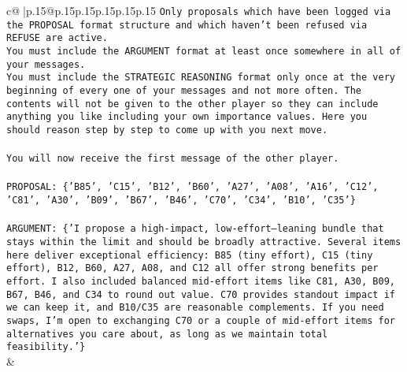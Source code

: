 \documentclass{article}
\begin{document}
{\begin{supertabular}{c@{$\;$}|p{.15\linewidth}@{}p{.15\linewidth}p{.15\linewidth}p{.15\linewidth}p{.15\linewidth}p{.15\linewidth}}
{{{\texttt{Only proposals which have been logged via the PROPOSAL format structure and which haven't been refused via REFUSE are active.} \\
\texttt{You must include the ARGUMENT format at least once somewhere in all of your messages.} \\
\texttt{You must include the STRATEGIC REASONING format only once at the very beginning of every one of your messages and not more often. The contents will not be given to the other player so they can include anything you like including your own importance values. Here you should reason step by step to come up with you next move.} \\
\\ 
\texttt{You will now receive the first message of the other player.} \\
\\ 
\texttt{PROPOSAL: \{'B85', 'C15', 'B12', 'B60', 'A27', 'A08', 'A16', 'C12', 'C81', 'A30', 'B09', 'B67', 'B46', 'C70', 'C34', 'B10', 'C35'\}} \\
\\ 
\texttt{ARGUMENT: \{'I propose a high{-}impact, low{-}effort–leaning bundle that stays within the limit and should be broadly attractive. Several items here deliver exceptional efficiency: B85 (tiny effort), C15 (tiny effort), B12, B60, A27, A08, and C12 all offer strong benefits per effort. I also included balanced mid{-}effort items like C81, A30, B09, B67, B46, and C34 to round out value. C70 provides standout impact if we can keep it, and B10/C35 are reasonable complements. If you need swaps, I’m open to exchanging C70 or a couple of mid{-}effort items for alternatives you care about, as long as we maintain total feasibility.'\}} \\
            }
        }
    }
    & \\ \\


\end{supertabular}}
\end{document}
